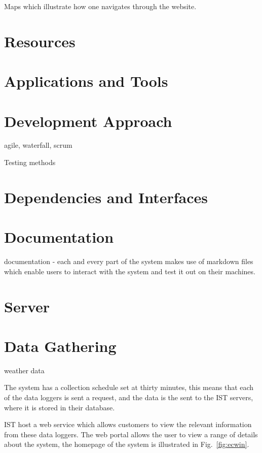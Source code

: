 \documentclass[12pt,onecolumn]{IEEEtran}
\begin{document}
Maps which illustrate how one navigates through the website. 

\section{Resources} \label{sec:Resources}

\section{Applications and Tools} \label{sec:ApplicationsAndTools}

\section{Development Approach} \label{sec:Development Approach}

agile, waterfall, scrum

Testing methods


\section{Dependencies and Interfaces} \label{sec:DependenciesInterfaces}



\section{Documentation} \label{sec:Documentation}
documentation - each and every part of the system makes use of markdown files which enable users to interact with the system and test it out on their machines. 

\section{Server} \label{sec:Server}
\section{Data Gathering} \label{sec:DataGathering}
weather data

The system has a collection schedule set at thirty minutes, this means that each of the data loggers is sent a request, and the data is the sent to the IST servers, where it is stored in their database. 


IST host a web service which allows customers to view the relevant information from these data loggers. 
The web portal allows the user to view a range of details about the system, the homepage of the system is illustrated in Fig.~\ref{fig:ecwin}.
\end{document}
